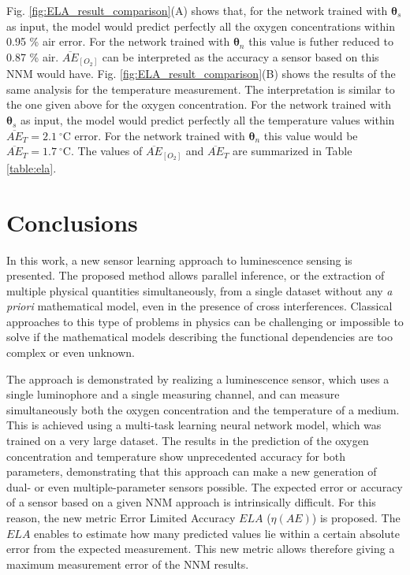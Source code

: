 \documentclass[sensors,article,submit,moreauthors,pdftex,10pt,a4paper]{Definitions/mdpi}
\begin{document}
Fig. \ref{fig:ELA_result_comparison}(A) shows that, for the network trained with ${\pmb \theta}_s$ as input, the model would predict perfectly all the oxygen concentrations within 0.95 \% air error. For the network trained with ${\pmb \theta}_n$ this value is futher reduced to 0.87 \% air. $\overline{AE}_{[O_2]}$ can be interpreted as the accuracy a sensor based on this NNM  would have.
Fig. \ref{fig:ELA_result_comparison}(B) shows the results of the same analysis for the temperature measurement. The interpretation is similar to the one given above for the oxygen concentration. For the network trained with ${\pmb \theta}_s$ as input, the model would predict perfectly all the temperature values within $\overline{AE}_{T}=2.1 \ ^\circ$C error. For the network trained with ${\pmb \theta}_n$ this value would be  $\overline{AE}_{T}=1.7 \ ^\circ$C. The values of $\overline{AE}_{[O_2]}$ and $\overline{AE}_{T}$ are summarized in Table \ref{table:ela}.



\section{Conclusions}

In this work, a new sensor learning approach to luminescence sensing is presented. The proposed method allows parallel inference, or the extraction of multiple physical quantities simultaneously, from a single dataset without any {\sl a priori} mathematical model, even in the presence of cross interferences. Classical approaches to this type of problems in physics can be challenging or impossible to solve if the mathematical models describing the functional dependencies are too complex or even unknown.

The approach is demonstrated by realizing a luminescence sensor, which uses a single luminophore and a single measuring channel, and can measure simultaneously both the oxygen concentration and the temperature of a medium. This is achieved using a multi-task learning neural network model, which was trained on a very large dataset. The results in the prediction of the oxygen concentration and temperature show unprecedented accuracy for both parameters, demonstrating that this approach can make a new generation of dual- or even multiple-parameter sensors possible.
The expected error or accuracy of a sensor based on a given NNM approach is intrinsically difficult. For this reason, the new metric Error Limited Accuracy $ELA$ ($\eta(AE)$) is proposed. The $ELA$ enables to estimate how many predicted values lie within a certain absolute error from the expected measurement. This new metric allows therefore giving a maximum measurement error of the NNM results.
\end{document}
